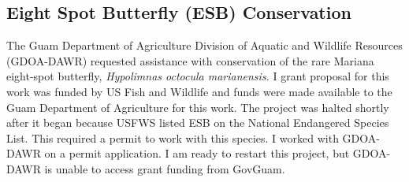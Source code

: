 \documentclass[12pt,english]{scrartcl}
\begin{document}
\begin{comment}
\raggedright\vspace{2mm}\textbf{Activity}
\begin{itemize}
\item I work closely with Jim McConnell's Guam Plant Extinction Prevention
Program. Many of Guam's rare plants are being attacked by invasive
insects. I routinely identify and document insect specimens collected
from the GPEPP plant nursery and from field surveys.
\item Annual report \cite{moore2018mcintirestennis2}.
\item Proposal \cite{moore2018mcintirestennis}.
\end{itemize}
\raggedright\vspace{2mm}\textbf{Reference(s)}

\begin{btSect}[vancouver]{zotero}
\btPrintCited
\end{btSect}
\newpage{}
\end{btUnit}

\begin{btUnit}
\end{comment}

\subsection{Eight Spot Butterfly (ESB) Conservation}

The Guam Department of Agriculture Division of Aquatic and Wildlife
Resources (GDOA-DAWR) requested assistance with conservation of the
rare Mariana eight-spot butterfly, \emph{Hypolimnas octocula marianensis.
}I grant proposal for this work was funded by US Fish and Wildlife
and funds were made available to the Guam Department of Agriculture
for this work. The project was halted shortly after it began because
USFWS listed ESB on the National Endangered Species List. This required
a permit to work with this species. I worked with GDOA-DAWR on a permit
application. I am ready to restart this project, but GDOA-DAWR is
unable to access grant funding from GovGuam.

\begin{comment}
\raggedright\vspace{2mm}\textbf{Activity}
\begin{itemize}
\item Progress on this project blocked by GovGuam beaurocracy. No progress
to report. \newpage{}
\end{itemize}
\end{btUnit}

\begin{btUnit}
\end{comment}
\end{document}

